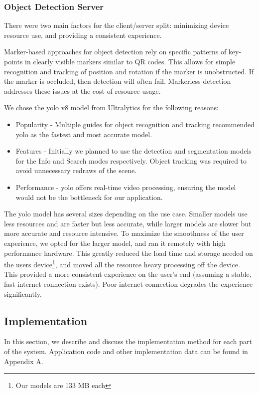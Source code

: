\documentclass[thesis]{fputhesis}
\begin{document}
\begin{body}
\subsubsection{Object Detection Server}
There were two main factors for the client/server split: minimizing device resource use, and providing a consistent experience. 

Marker-based approaches for object detection rely on specific patterns of key-points in clearly visible markers similar to QR codes. This allows for simple recognition and tracking of position and rotation if the marker is unobstructed. If the marker is occluded, then detection will often fail. Markerless detection addresses these issues at the cost of resource usage. 

We chose the \acrfull{yolo} v8 model from Ultralytics\cite{Jocher_Ultralytics_YOLO_2023} for the following reasons:
\begin{itemize}
    \item Popularity - Multiple guides for object recognition and tracking recommended \acrshort{yolo} as the fastest and most accurate model.
    \item Features - Initially we planned to use the detection and segmentation models for the Info and Search modes respectively. Object tracking was required to avoid unnecessary redraws of the scene.
    \item Performance - \acrshort{yolo} offers real-time video processing, ensuring the model would not be the bottleneck for our application.
\end{itemize}
The \acrshort{yolo} model has several sizes depending on the use case. Smaller models use less resources and are faster but less accurate, while larger models are slower but more accurate and resource intensive. To maximize the smoothness of the user experience, we opted for the larger model, and ran it remotely with high performance hardware. This greatly reduced the load time and storage needed on the users device\footnote{Our models are 133 MB each}, and moved all the resource heavy processing off the device. This provided a more consistent experience on the user's end (assuming a stable, fast internet connection exists). Poor internet connection degrades the experience significantly.

\subsection{Implementation}
In this section, we describe and discuss the implementation method for each part of the system. Application code and other implementation data can be found in Appendix A.

\end{body}
\end{document}
